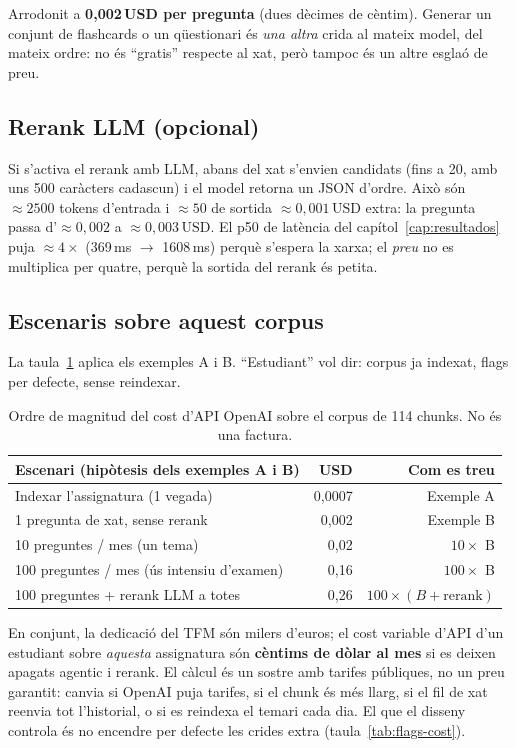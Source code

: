 Arrodonit a \textbf{0,002\,USD per pregunta} (dues dècimes de cèntim). Generar un conjunt de flashcards o un qüestionari és \emph{una altra} crida al mateix model, del mateix ordre: no és ``gratis'' respecte al xat, però tampoc és un altre esglaó de preu.

\subsection{Rerank LLM (opcional)}

Si s'activa el rerank amb LLM, abans del xat s'envien candidats (fins a 20, amb uns 500 caràcters cadascun) i el model retorna un JSON d'ordre. Això són $\approx 2500$ tokens d'entrada i $\approx 50$ de sortida $\approx 0{,}001\,\mathrm{USD}$ extra: la pregunta passa d'$\approx 0{,}002$ a $\approx 0{,}003\,\mathrm{USD}$. El p50 de latència del capítol~\ref{cap:resultados} puja $\approx 4\times$ (369\,ms $\rightarrow$ 1608\,ms) perquè s'espera la xarxa; el \emph{preu} no es multiplica per quatre, perquè la sortida del rerank és petita.

\subsection{Escenaris sobre aquest corpus}

La taula~\ref{tab:cost-escenaris} aplica els exemples A i B. ``Estudiant'' vol dir: corpus ja indexat, flags per defecte, sense reindexar.

\begin{table}[htbp]
\centering
\caption{Ordre de magnitud del cost d'API OpenAI sobre el corpus de 114 chunks. No és una factura.}
\label{tab:cost-escenaris}
\small
\begin{tabularx}{\textwidth}{X r r}
\toprule
Escenari (hipòtesis dels exemples A i B) & USD & Com es treu \\
\midrule
Indexar l'assignatura (1 vegada) & 0,0007 & Exemple A \\
1 pregunta de xat, sense rerank & 0,002 & Exemple B \\
10 preguntes / mes (un tema) & 0,02 & $10\times$ B \\
100 preguntes / mes (ús intensiu d'examen) & 0,16 & $100\times$ B \\
100 preguntes + rerank LLM a totes & 0,26 & $100\times(B+\text{rerank})$ \\
\bottomrule
\end{tabularx}
\end{table}

En conjunt, la dedicació del TFM són milers d'euros; el cost variable d'API d'un estudiant sobre \emph{aquesta} assignatura són \textbf{cèntims de dòlar al mes} si es deixen apagats agentic i rerank. El càlcul és un sostre amb tarifes públiques, no un preu garantit: canvia si OpenAI puja tarifes, si el chunk és més llarg, si el fil de xat reenvia tot l'historial, o si es reindexa el temari cada dia. El que el disseny controla és no encendre per defecte les crides extra (taula~\ref{tab:flags-cost}).
